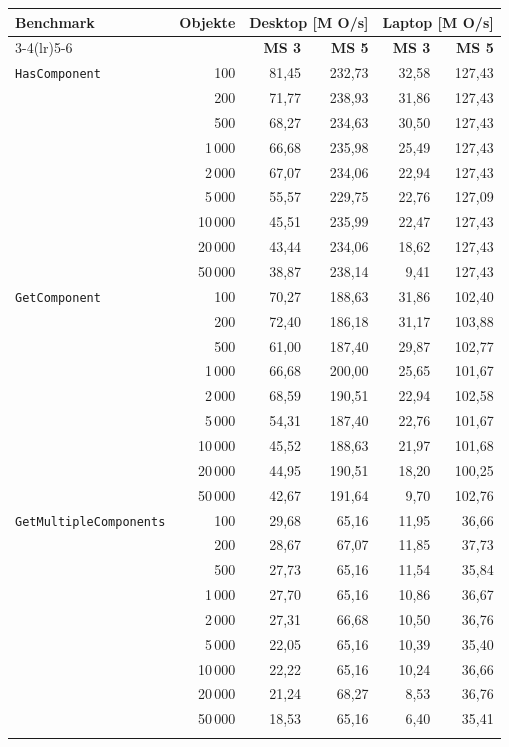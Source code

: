 \begin{table}[H]
\centering
\begin{tabular}{l r rr rr}
\toprule
\textbf{Benchmark} & \textbf{Objekte}
& \multicolumn{2}{c}{\textbf{Desktop [M O/s]}}
& \multicolumn{2}{c}{\textbf{Laptop [M O/s]}} \\
\cmidrule(lr){3-4}\cmidrule(lr){5-6}
& & \textbf{MS 3} & \textbf{MS 5} & \textbf{MS 3} & \textbf{MS 5} \\
\midrule
\texttt{HasComponent}
& 100     &  81,45 & 232,73 &  32,58 & 127,43 \\
& 200     &  71,77 & 238,93 &  31,86 & 127,43 \\
& 500     &  68,27 & 234,63 &  30,50 & 127,43 \\
& 1\,000  &  66,68 & 235,98 &  25,49 & 127,43 \\
& 2\,000  &  67,07 & 234,06 &  22,94 & 127,43 \\
& 5\,000  &  55,57 & 229,75 &  22,76 & 127,09 \\
& 10\,000 &  45,51 & 235,99 &  22,47 & 127,43 \\
& 20\,000 &  43,44 & 234,06 &  18,62 & 127,43 \\
& 50\,000 &  38,87 & 238,14 &   9,41 & 127,43 \\
\addlinespace

\texttt{GetComponent}
& 100     &  70,27 & 188,63 &  31,86 & 102,40 \\
& 200     &  72,40 & 186,18 &  31,17 & 103,88 \\
& 500     &  61,00 & 187,40 &  29,87 & 102,77 \\
& 1\,000  &  66,68 & 200,00 &  25,65 & 101,67 \\
& 2\,000  &  68,59 & 190,51 &  22,94 & 102,58 \\
& 5\,000  &  54,31 & 187,40 &  22,76 & 101,67 \\
& 10\,000 &  45,52 & 188,63 &  21,97 & 101,68 \\
& 20\,000 &  44,95 & 190,51 &  18,20 & 100,25 \\
& 50\,000 &  42,67 & 191,64 &   9,70 & 102,76 \\
\addlinespace

\texttt{GetMultipleComponents}
& 100     &  29,68 &  65,16 &  11,95 &  36,66 \\
& 200     &  28,67 &  67,07 &  11,85 &  37,73 \\
& 500     &  27,73 &  65,16 &  11,54 &  35,84 \\
& 1\,000  &  27,70 &  65,16 &  10,86 &  36,67 \\
& 2\,000  &  27,31 &  66,68 &  10,50 &  36,76 \\
& 5\,000  &  22,05 &  65,16 &  10,39 &  35,40 \\
& 10\,000 &  22,22 &  65,16 &  10,24 &  36,66 \\
& 20\,000 &  21,24 &  68,27 &   8,53 &  36,76 \\
& 50\,000 &  18,53 &  65,16 &   6,40 &  35,41 \\
\addlinespace


\end{tabular}
\end{table}
